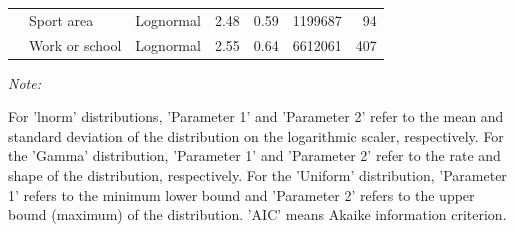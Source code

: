 \documentclass[preprint, 3p,
authoryear]{elsarticle} %
\begin{document}
\begin{table}
{\begin{threeparttable}
\begin{tabular}[t]{rllrrrr}
 & Sport area & Lognormal & 2.48 & 0.59 & 1199687 & 94\\

\multirow[t]{-12}{*}{\raggedleft\arraybackslash 2015} & Work or school & Lognormal & 2.55 & 0.64 & 6612061 & 407\\
\bottomrule
\end{tabular}
\begin{tablenotes}
\item \textit{Note: } 
\item For 'lnorm' distributions, 'Parameter 1' and 'Parameter 2' refer to the mean and standard deviation of the distribution on the logarithmic scaler, respectively. For the 'Gamma' distribution, 'Parameter 1' and 'Parameter 2' refer to the rate and shape of the distribution, respectively. For the 'Uniform' distribution,  'Parameter 1' refers to the minimum lower bound and 'Parameter 2'  refers to the upper bound (maximum) of the distribution.  'AIC' means Akaike information criterion.
\end{tablenotes}
\end{threeparttable}}
\end{table}
\end{document}

